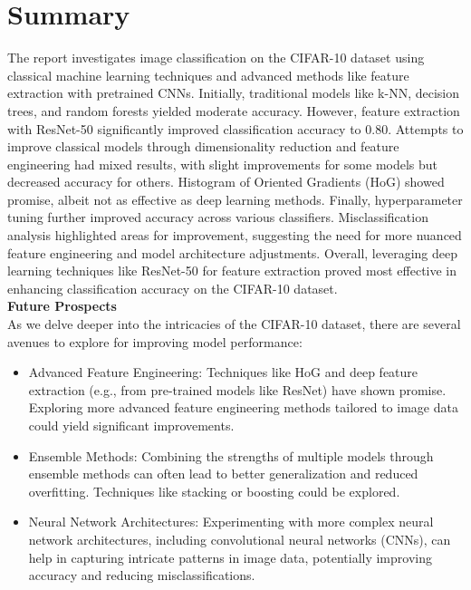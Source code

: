 \documentclass[a4paper]{article}
\theoremstyle{plain}
\theoremstyle{definition}
\begin{document}
	\section{Summary}
	\label{sec:app}
	The report investigates image classification on the CIFAR-10 dataset using classical machine learning techniques and advanced methods like feature extraction with pretrained CNNs. Initially, traditional models like k-NN, decision trees, and random forests yielded moderate accuracy. However, feature extraction with ResNet-50 significantly improved classification accuracy to 0.80. Attempts to improve classical models through dimensionality reduction and feature engineering had mixed results, with slight improvements for some models but decreased accuracy for others. Histogram of Oriented Gradients (HoG) showed promise, albeit not as effective as deep learning methods. Finally, hyperparameter tuning further improved accuracy across various classifiers. Misclassification analysis highlighted areas for improvement, suggesting the need for more nuanced feature engineering and model architecture adjustments. Overall, leveraging deep learning techniques like ResNet-50 for feature extraction proved most effective in enhancing classification accuracy on the CIFAR-10 dataset.\\
 
 \textbf{Future Prospects}\\
As we delve deeper into the intricacies of the CIFAR-10 dataset, there are several avenues to explore for improving model performance:
\begin{itemize}
    \item Advanced Feature Engineering: Techniques like HoG and deep feature extraction (e.g., from pre-trained models like ResNet) have shown promise. Exploring more advanced feature engineering methods tailored to image data could yield significant improvements.
    \item Ensemble Methods: Combining the strengths of multiple models through ensemble methods can often lead to better generalization and reduced overfitting. Techniques like stacking or boosting could be explored.
    \item Neural Network Architectures: Experimenting with more complex neural network architectures, including convolutional neural networks (CNNs), can help in capturing intricate patterns in image data, potentially improving accuracy and reducing misclassifications.
\end{itemize}

	
	
\end{document}
